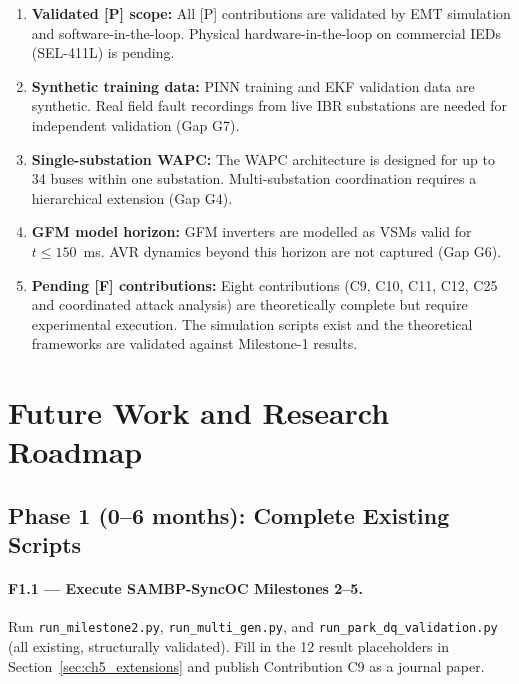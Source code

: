\begin{enumerate}
\item \textbf{Validated [P] scope:} All [P] contributions are validated
      by EMT simulation and software-in-the-loop. Physical hardware-in-the-loop
      on commercial IEDs (SEL-411L) is pending.

\item \textbf{Synthetic training data:} PINN training and EKF validation
      data are synthetic. Real field fault recordings from live IBR
      substations are needed for independent validation (Gap G7).

\item \textbf{Single-substation WAPC:} The WAPC architecture is designed
      for up to 34 buses within one substation. Multi-substation
      coordination requires a hierarchical extension (Gap G4).

\item \textbf{GFM model horizon:} GFM inverters are modelled as VSMs
      valid for $t \leq 150$~ms. AVR dynamics beyond this horizon are
      not captured (Gap G6).

\item \textbf{Pending [F] contributions:} Eight contributions
      (C9, C10, C11, C12, C25 and coordinated attack analysis) are
      theoretically complete but require experimental execution. The
      simulation scripts exist and the theoretical frameworks are validated
      against Milestone-1 results.
\end{enumerate}

\section{Future Work and Research Roadmap}
\label{sec:ch13_future}

\subsection{Phase 1 (0--6 months): Complete Existing Scripts}

\paragraph{F1.1 --- Execute SAMBP-SyncOC Milestones 2--5.}
Run \texttt{run\_milestone2.py}, \texttt{run\_multi\_gen.py}, and
\texttt{run\_park\_dq\_validation.py} (all existing, structurally validated).
Fill in the 12 result placeholders in Section~\ref{sec:ch5_extensions}
and publish Contribution C9 as a journal paper.

